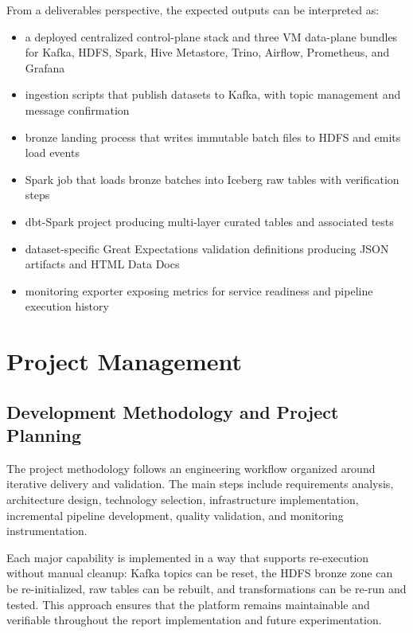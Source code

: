 From a deliverables perspective, the expected outputs can be interpreted as:
\begin{itemize}
    \item a deployed centralized control-plane stack and three VM data-plane bundles for Kafka, HDFS, Spark, Hive Metastore, Trino, Airflow, Prometheus, and Grafana
    \item ingestion scripts that publish datasets to Kafka, with topic management and message confirmation
    \item bronze landing process that writes immutable batch files to HDFS and emits load events
    \item Spark job that loads bronze batches into Iceberg raw tables with verification steps
    \item dbt-Spark project producing multi-layer curated tables and associated tests
    \item dataset-specific Great Expectations validation definitions producing JSON artifacts and HTML Data Docs
    \item monitoring exporter exposing metrics for service readiness and pipeline execution history
\end{itemize}

\section{Project Management}

\subsection{Development Methodology and Project Planning}
The project methodology follows an engineering workflow organized around iterative delivery and validation. The main steps include requirements analysis, architecture design, technology selection, infrastructure implementation, incremental pipeline development, quality validation, and monitoring instrumentation.

Each major capability is implemented in a way that supports re-execution without manual cleanup: Kafka topics can be reset, the HDFS bronze zone can be re-initialized, raw tables can be rebuilt, and transformations can be re-run and tested. This approach ensures that the platform remains maintainable and verifiable throughout the report implementation and future experimentation.

